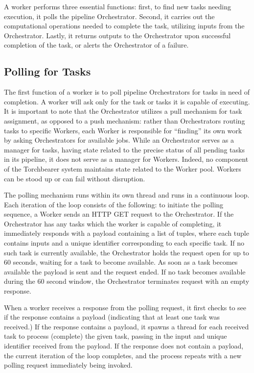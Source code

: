 A worker performs three essential functions: first, to find new tasks needing execution, it polls the pipeline Orchestrator. Second, it carries out the computational operations needed to complete the task, utilizing inputs from the Orchestrator. Lastly, it returns outputs to the Orchestrator upon successful completion of the task, or alerts the Orchestrator of a failure. 
 
\subsection{Polling for Tasks}
The first function of a worker is to poll pipeline Orchestrators for tasks in need of completion. A worker will ask only for the task or tasks it is capable of executing. It is important to note that the Orchestrator utilizes a pull mechanism for task assignment, as opposed to a push mechanism: rather than Orchestrators routing tasks to specific Workers, each Worker is responsible for “finding” its own work by asking Orchestrators for available jobs. While an Orchestrator serves as a manager for tasks, having state related to the precise status of all pending tasks in its pipeline, it does not serve as a manager for Workers. Indeed, no component of the Torchbearer system maintains state related to the Worker pool. Workers can be stood up or can fail without disruption.

The polling mechanism runs within its own thread and runs in a continuous loop. Each iteration of the loop consists of the following: to initiate the polling sequence, a Worker sends an HTTP GET request to the Orchestrator. If the Orchestrator has any tasks which the worker is capable of completing, it immediately responds with a payload containing a list of tuples, where each tuple contains inputs and a unique identifier corresponding to each specific task. If no such task is currently available, the Orchestrator holds the request open for up to 60 seconds, waiting for a task to become available. As soon as a task becomes available the payload is sent and the request ended. If no task becomes available during the 60 second window, the Orchestrator terminates request with an empty response.

When a worker receives a response from the polling request, it first checks to see if the response contains a payload (indicating that at least one task was received.) If the response contains a payload, it spawns a thread for each received task to process (complete) the given task, passing in the input and unique identifier received from the payload. If the response does not contain a payload, the current iteration of the loop completes, and the process repeats with a new polling request immediately being invoked.

